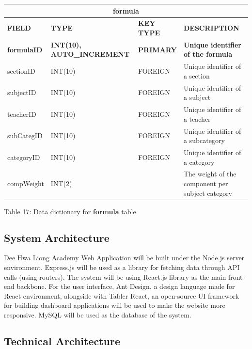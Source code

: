 \documentclass[11pt,a4paper,titlepage]{article}
\begin{document}
\vspace{1cm}
\begin{longtable}{ |p{2.5cm}|p{4.5cm}|p{2.5cm}|p{3cm}|  }
    \hline
    \multicolumn{4}{|c|}{\textbf{formula}} \\
    \hline
    \textbf{FIELD}&\textbf{TYPE}&\textbf{KEY TYPE}&\textbf{DESCRIPTION}\\
    \hline
    \textbf{formulaID}  & \textbf{INT(10), AUTO\_INCREMENT} & \textbf{PRIMARY} & \textbf{Unique identifier of the formula}\\ \hline
    sectionID & INT(10) & FOREIGN & Unique identifier of a section\\ \hline
    subjectID & INT(10) & FOREIGN & Unique identifier of a subject\\ \hline
    teacherID & INT(10) & FOREIGN & Unique identifier of a teacher\\ \hline
    subCategID & INT(10) & FOREIGN & Unique identifier of a subcategory\\ \hline
    categoryID & INT(10) & FOREIGN & Unique identifier of a category\\ \hline
    compWeight & INT(2) & & The weight of the component per subject category\\ \hline

\end{longtable}

\vspace{.5cm}
\begin{center}
    Table 17: Data dictionary for \textbf{formula} table
\end{center}

\newpage

\subsection{System Architecture}

Dee Hwa Liong Academy Web Application will be built under the Node.js server environment. Express.js will be used as a library for fetching data through API calls (using routers). The system will be using React.js library as the main front-end backbone. For the user interface, Ant Design, a design language made for React environment, alongside with Tabler React, an open-source UI framework for building dashboard applications will be used to make the website more responsive. MySQL will be used as the database of the system.

\subsection{Technical Architecture}
\end{document}
